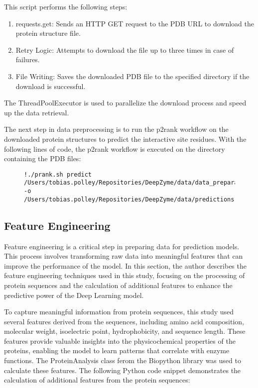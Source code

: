 This script performs the following steps:
\begin{enumerate}
    \item requests.get: Sends an HTTP GET request to the PDB URL to download the protein structure file.
    \item Retry Logic: Attempts to download the file up to three times in case of failures.
    \item File Writing: Saves the downloaded PDB file to the specified directory if the download is successful.
\end{enumerate}

The ThreadPoolExecutor is used to parallelize the download process and speed up the data retrieval.

The next step in data preprocessing is to run the p2rank workflow on the downloaded protein structures to predict the interactive site residues. With the following lines of code, the p2rank workflow is executed on the directory containing the PDB files:

\begin{figure}[bht]
\begin{lstlisting}[caption=Command Line for running p2rank on a given directory, label=lst:p2rank-workflow]
    !./prank.sh predict /Users/tobias.polley/Repositories/DeepZyme/data/data_preparation/raw_pdbs/dataset.ds -o /Users/tobias.polley/Repositories/DeepZyme/data/predictions
\end{lstlisting}
\end{figure}

\subsection{Feature Engineering}
\label{sec:Feature Engineering}

Feature engineering is a critical step in preparing data for prediction models. This process involves transforming raw data into meaningful features that can improve the performance of the model. In this section, the author describes the feature engineering techniques used in this study, focusing on the processing of protein sequences and the calculation of additional features to enhance the predictive power of the Deep Learning model.

To capture meaningful information from protein sequences, this study used several features derived from the sequences, including amino acid composition, molecular weight, isoelectric point, hydrophobicity, and sequence length. These features provide valuable insights into the physicochemical properties of the proteins, enabling the model to learn patterns that correlate with enzyme functions. The ProteinAnalysis class ferom the Biopython library was used to calculate these features. The following Python code snippet demonstrates the calculation of additional features from the protein sequences:

